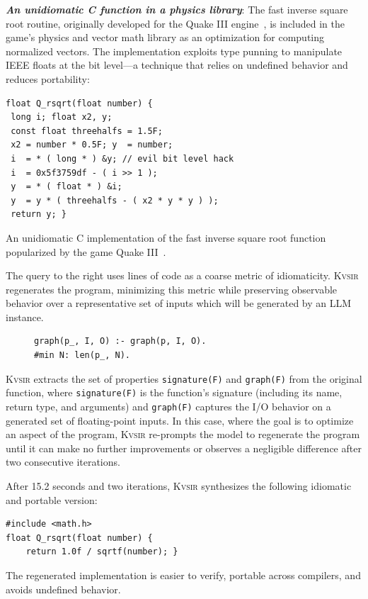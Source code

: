 \documentclass[sigplan,review,anonymous,10pt]{acmart}
\newcommand{\sys}{{\scshape Kv{\textalpha}sir}\xspace}
\newcommand{\heading}[1]{\vspace{2pt}\noindent\textbf{\emph{#1}}:\enspace}
\begin{document}
\heading{An unidiomatic C function in a physics library}
The fast inverse square root routine, originally developed for the Quake III
engine~\cite{fast_inv_sqrt}, is included in the game's physics and vector math
library as an optimization for computing normalized vectors.
The implementation
exploits type punning to manipulate IEEE floats at the bit level—a technique
that relies on undefined behavior and reduces portability:
\begin{listing}
\begin{verbatim}
float Q_rsqrt(float number) {
 long i; float x2, y;
 const float threehalfs = 1.5F;
 x2 = number * 0.5F; y  = number;
 i  = * ( long * ) &y; // evil bit level hack
 i  = 0x5f3759df - ( i >> 1 );
 y  = * ( float * ) &i;
 y  = y * ( threehalfs - ( x2 * y * y ) );
 return y; }
\end{verbatim}
\caption{An unidiomatic C implementation of the fast inverse square root function popularized by the game Quake III~\cite{fast_inv_sqrt}.}
\end{listing}
The query to the right uses lines of code as a coarse metric of
idiomaticity. \sys regenerates the program, minimizing this metric while
preserving observable behavior over a representative set of inputs which will be generated by an LLM instance.
\begin{figure}
  \begin{verbatim}
graph(p_, I, O) :- graph(p, I, O).
#min N: len(p_, N).
  \end{verbatim}
\end{figure}
\sys extracts the set of properties \texttt{signature(F)} and \texttt{graph(F)}
from the original function, where \texttt{signature(F)} is the function's
signature (including its name, return type, and arguments) and
\texttt{graph(F)} captures the I/O behavior on a generated set of
floating-point inputs.
In this case, where the goal is to optimize an aspect of the program, \sys
re-prompts the model to regenerate the program until it can make no further
improvements or observes a negligible difference after two consecutive
iterations.

After 15.2 seconds and two iterations, \sys synthesizes the following idiomatic and portable version:
\begin{verbatim}
#include <math.h>
float Q_rsqrt(float number) {
    return 1.0f / sqrtf(number); }
\end{verbatim}
The regenerated implementation is easier to verify, portable across compilers, and avoids undefined behavior.
\end{document}
